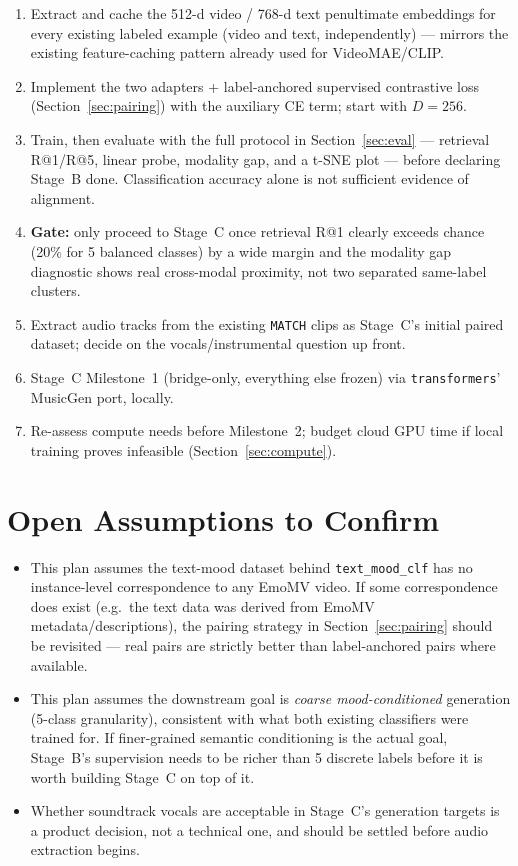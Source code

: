 \documentclass[11pt]{article}
\begin{document}
\begin{enumerate}
\item Extract and cache the 512-d video / 768-d text penultimate embeddings for every existing
labeled example (video and text, independently) — mirrors the existing feature-caching pattern
already used for VideoMAE/CLIP.
\item Implement the two adapters + label-anchored supervised contrastive loss
(Section~\ref{sec:pairing}) with the auxiliary CE term; start with $D=256$.
\item Train, then evaluate with the full protocol in Section~\ref{sec:eval} — retrieval R@1/R@5,
linear probe, modality gap, and a t-SNE plot — before declaring Stage~B done. Classification
accuracy alone is not sufficient evidence of alignment.
\item \textbf{Gate:} only proceed to Stage~C once retrieval R@1 clearly exceeds chance (20\% for
5 balanced classes) by a wide margin and the modality gap diagnostic shows real cross-modal
proximity, not two separated same-label clusters.
\item Extract audio tracks from the existing \texttt{MATCH} clips as Stage~C's initial paired
dataset; decide on the vocals/instrumental question up front.
\item Stage~C Milestone~1 (bridge-only, everything else frozen) via
\texttt{transformers}' MusicGen port, locally.
\item Re-assess compute needs before Milestone~2; budget cloud GPU time if local training proves
infeasible (Section~\ref{sec:compute}).
\end{enumerate}

\section*{Open Assumptions to Confirm}
\begin{itemize}
\item This plan assumes the text-mood dataset behind \texttt{text\_mood\_clf} has no
instance-level correspondence to any EmoMV video. If some correspondence does exist (e.g.\ the
text data was derived from EmoMV metadata/descriptions), the pairing strategy in
Section~\ref{sec:pairing} should be revisited — real pairs are strictly better than label-anchored
pairs where available.
\item This plan assumes the downstream goal is \emph{coarse mood-conditioned} generation (5-class
granularity), consistent with what both existing classifiers were trained for. If finer-grained
semantic conditioning is the actual goal, Stage~B's supervision needs to be richer than 5 discrete
labels before it is worth building Stage~C on top of it.
\item Whether soundtrack vocals are acceptable in Stage~C's generation targets is a product
decision, not a technical one, and should be settled before audio extraction begins.
\end{itemize}
\end{document}
